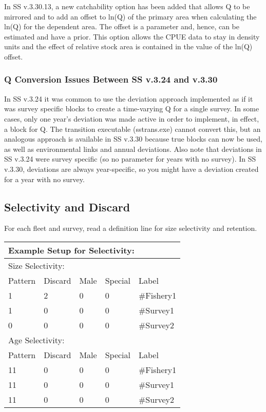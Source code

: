 In SS v.3.30.13, a new catchability option has been added that allows Q to be mirrored and to add an offset to ln(Q) of the primary area when calculating the ln(Q) for the dependent area. The offset is a parameter and, hence, can be estimated and have a prior. This option allows the CPUE data to stay in density units and the effect of relative stock area is contained in the value of the ln(Q) offset.


\subsubsection{Q Conversion Issues Between SS v.3.24 and v.3.30}
In SS v.3.24 it was common to use the deviation approach implemented as if it was survey specific blocks to create a time-varying Q for a single survey.  In some cases, only one year's deviation was made active in order to implement, in effect, a block for Q.  The transition executable (sstrans.exe) cannot convert this, but an analogous approach is available in SS v.3.30 because true blocks can now be used, as well as environmental links and annual deviations. Also note that deviations in SS v.3.24 were survey specific (so no parameter for years with no survey). In SS v.3.30, deviations are always year-specific, so you might have a deviation created for a year with no survey.

\subsection{Selectivity and Discard}
For each fleet and survey, read a definition line for size selectivity and retention. 

\begin{center}
	\begin{longtable}{p{2cm} p{2cm} p{2cm} p{2cm} p{6.5cm} }
		\multicolumn{5}{l}{Example Setup for Selectivity:}\Tstrut\\
		\hline
		\multicolumn{5}{l}{Size Selectivity:}\Tstrut\\
		Pattern & Discard & Male & Special & Label \Bstrut\\
		\hline
		1  & 2 & 0 & 0 & \#Fishery1\Tstrut\\
		1  & 0 & 0 & 0 & \#Survey1\\
		0  & 0 & 0 & 0 & \#Survey2\Bstrut\\
		\hline
		
		\multicolumn{5}{l}{Age Selectivity:}\Tstrut\\
		Pattern & Discard & Male & Special & Label \Bstrut\\
		\hline
		11  & 0 & 0 & 0 & \#Fishery1\Tstrut\\
		11  & 0 & 0 & 0 & \#Survey1\\
		11  & 0 & 0 & 0 & \#Survey2\Bstrut\\
		\hline
	\end{longtable}
\end{center}

